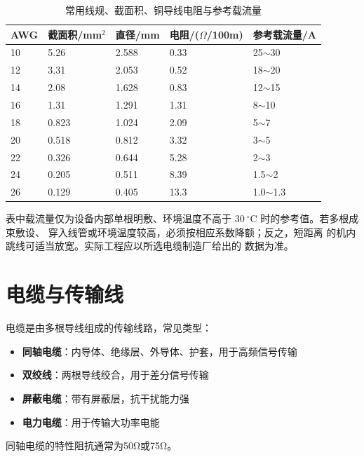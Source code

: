 \begin{table}[htbp]
\centering
\caption{常用线规、截面积、铜导线电阻与参考载流量}
\begin{tabular}{|p{1.8cm}|p{2.2cm}|p{2.0cm}|p{2.4cm}|p{2.4cm}|}
\hline
\textbf{AWG} & \textbf{截面积/mm$^2$} & \textbf{直径/mm} & \textbf{电阻/($\Omega$/100m)} & \textbf{参考载流量/A} \\
\hline
10 & 5.26 & 2.588 & 0.33 & 25$\sim$30 \\
\hline
12 & 3.31 & 2.053 & 0.52 & 18$\sim$20 \\
\hline
14 & 2.08 & 1.628 & 0.83 & 12$\sim$15 \\
\hline
16 & 1.31 & 1.291 & 1.31 & 8$\sim$10 \\
\hline
18 & 0.823 & 1.024 & 2.09 & 5$\sim$7 \\
\hline
20 & 0.518 & 0.812 & 3.32 & 3$\sim$5 \\
\hline
22 & 0.326 & 0.644 & 5.28 & 2$\sim$3 \\
\hline
24 & 0.205 & 0.511 & 8.39 & 1.5$\sim$2 \\
\hline
26 & 0.129 & 0.405 & 13.3 & 1.0$\sim$1.3 \\
\hline
\end{tabular}
\end{table}

表中载流量仅为设备内部单根明敷、环境温度不高于
$30\ ^{\circ}\mathrm{C}$ 时的参考值。若多根成束敷设、
穿入线管或环境温度较高，必须按相应系数降额；反之，短距离
的机内跳线可适当放宽。实际工程应以所选电缆制造厂给出的
数据为准。

\section{电缆与传输线}
\label{sec:cables_transmission_lines}

电缆是由多根导线组成的传输线路，常见类型：

\begin{itemize}
    \item \textbf{同轴电缆}：内导体、绝缘层、外导体、护套，用于高频信号传输
    \item \textbf{双绞线}：两根导线绞合，用于差分信号传输
    \item \textbf{屏蔽电缆}：带有屏蔽层，抗干扰能力强
    \item \textbf{电力电缆}：用于传输大功率电能
\end{itemize}

同轴电缆的特性阻抗通常为50Ω或75Ω。

